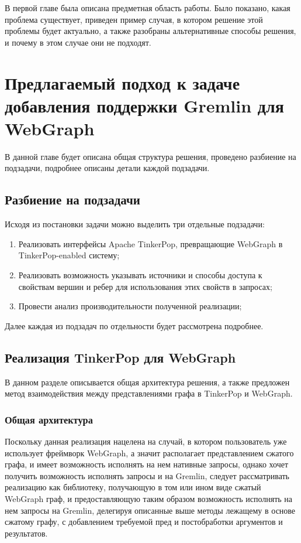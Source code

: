 \documentclass[times,specification,annotation]{itmo-student-thesis}
\begin{document}
\finishrelatedwork

\chapterconclusion
В первой главе была описана предметная область работы. Было показано, какая проблема существует, приведен пример случая, в котором решение этой проблемы будет актуально, а также разобраны альтернативные способы решения, и почему в этом случае они не подходят.

\chapter{Предлагаемый подход к задаче добавления поддержки Gremlin для WebGraph}

В данной главе будет описана общая структура решения, проведено разбиение на подзадачи, подробнее описаны детали каждой подзадачи. 

\section{Разбиение на подзадачи}

Исходя из постановки задачи можно выделить три отдельные подзадачи:

\begin{enumerate}
    \item Реализовать интерфейсы Apache TinkerPop, превращающие WebGraph в TinkerPop-enabled систему;
    \item Реализовать возможность указывать источники и способы доступа к свойствам вершин и ребер для использования этих свойств в запросах;
    \item Провести анализ производительности полученной реализации;
\end{enumerate}

Далее каждая из подзадач по отдельности будет рассмотрена подробнее.

\section{Реализация TinkerPop для WebGraph}

В данном разделе описывается общая архитектура решения, а также предложен метод взаимодействия между представлениями графа в TinkerPop и WebGraph.

\subsection{Общая архитектура}

Поскольку данная реализация нацелена на случай, в котором пользователь уже использует фреймворк WebGraph, а значит располагает представлением сжатого графа, и имеет возможность исполнять на нем нативные запросы, однако хочет получить возможность исполнять запросы и на Gremlin, следует рассматривать реализацию как библиотеку, получающую в том или ином виде сжатый WebGraph граф, и предоставляющую таким образом возможность исполнять на нем запросы на Gremlin, делегируя описанные выше методы лежащему в основе сжатому графу, с добавлением требуемой пред и постобработки аргументов и результатов.
\end{document}

